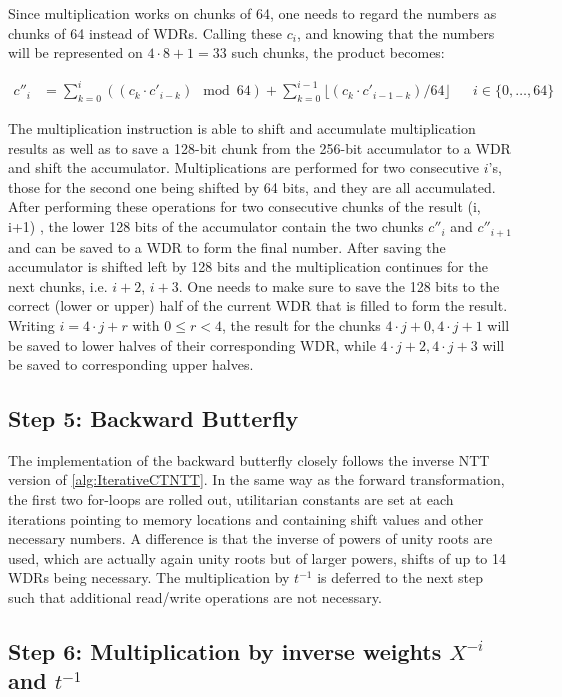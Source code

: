 Since multiplication works on chunks of 64, one needs to regard the numbers as chunks of 64 instead of WDRs. Calling these $c_i$, and knowing that the numbers will be represented on $4 \cdot 8 + 1 = 33$ such chunks, the product becomes:

\begin{align*}
  c''_i &= \sum_{k=0}^{i} ((c_k \cdot c'_{i - k}) \mod 64) + \sum_{k=0}^{i-1} \lfloor (c_k \cdot c'_{i - 1 - k}) / 64 \rfloor && i \in \{0, \ldots, 64\}
\end{align*}

The multiplication instruction is able to shift and accumulate multiplication results as well as to save a 128-bit chunk from the 256-bit accumulator to a WDR and shift the accumulator. Multiplications are performed for two consecutive $i$'s, those for the second one being shifted by 64 bits, and they are all accumulated. After performing these operations for two consecutive chunks of the result (i, i+1) , the lower 128 bits of the accumulator contain the two chunks $c''_i$ and $c''_{i+1}$ and can be saved to a WDR to form the final number. After saving the accumulator is shifted left by 128 bits and the multiplication continues for the next chunks, i.e. $i + 2$, $i + 3$. One needs to make sure to save the 128 bits to the correct (lower or upper) half of the current WDR that is filled to form the result. Writing $i = 4 \cdot j + r$ with $0 \leq r < 4$, the result for the chunks $4 \cdot j + 0, 4 \cdot j + 1$ will be saved to lower halves of their corresponding WDR, while $4 \cdot j + 2, 4 \cdot j + 3$ will be saved to corresponding upper halves. 


\subsection{Step 5: Backward Butterfly}

The implementation of the backward butterfly closely follows the inverse NTT version of \cref{alg:IterativeCTNTT}. In the same way as the forward transformation, the first two for-loops are rolled out, utilitarian constants are set at each iterations pointing to memory locations and containing shift values and other necessary numbers. A difference is that the inverse of powers of unity roots are used, which are actually again unity roots but of larger powers, shifts of up to 14 WDRs being necessary. The multiplication by $t^{-1}$ is deferred to the next step such that additional read/write operations are not necessary.

\subsection{Step 6: Multiplication by inverse weights $X^{-i}$ and $t^{-1}$}

